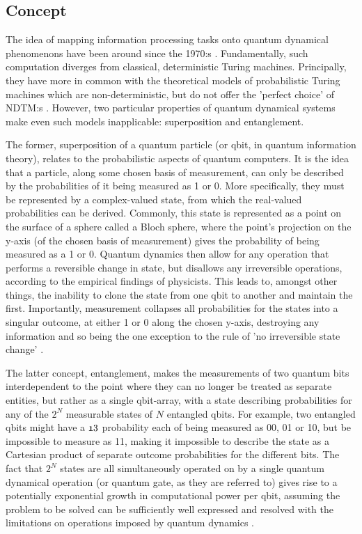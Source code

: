 \documentclass[msc,lith,english]{liuthesis}
\begin{document}
\subsection{Concept}
The idea of mapping information processing tasks onto quantum dynamical phenomenons have been around since the 1970:s \cite{QCQI}. Fundamentally, such computation diverges from classical, deterministic Turing machines. Principally, they have more in common with the theoretical models of probabilistic Turing machines which are non-deterministic, but do not offer the 'perfect choice' of NDTM:s \cite{CCAMA}. However, two particular properties of quantum dynamical systems make even such models inapplicable: superposition and entanglement. 

The former, superposition of a quantum particle (or qbit, in quantum information theory), relates to the probabilistic aspects of quantum computers. It is the idea that a particle, along some chosen basis of measurement, can only be described by the probabilities of it being measured as 1 or 0. More specifically, they must be represented by a complex-valued state, from which the real-valued probabilities can be derived. Commonly, this state is represented as a point on the surface of a sphere called a Bloch sphere, where the point's projection on the y-axis (of the chosen basis of measurement) gives the probability of being measured as a 1 or 0. Quantum dynamics then allow for any operation that performs a reversible change in state, but disallows any irreversible operations, according to the empirical findings of physicists. This leads to, amongst other things, the inability to clone the state from one qbit to another and maintain the first. Importantly, measurement collapses all probabilities for the states into a singular outcome, at either 1 or 0 along the chosen y-axis, destroying any information and so being the one exception to the rule of 'no irreversible state change' \cite{QCQI}.

The latter concept, entanglement, makes the measurements of two quantum bits interdependent to the point where they can no longer be treated as separate entities, but rather as a single qbit-array, with a state describing probabilities for any of the $2^N$ measurable states of $N$ entangled qbits. For example, two entangled qbits might have a $\frak{1}{3}$ probability each of being measured as 00, 01 or 10, but be impossible to measure as 11, making it impossible to describe the state as a Cartesian product of separate outcome probabilities for the different bits. The fact that $2^N$ states are all simultaneously operated on by a single quantum dynamical operation (or quantum gate, as they are referred to) gives rise to a potentially exponential growth in computational power per qbit, assuming the problem to be solved can be sufficiently well expressed and resolved with the limitations on operations imposed by quantum dynamics \cite{QCQI}\cite{EIQC}. 
\end{document}
